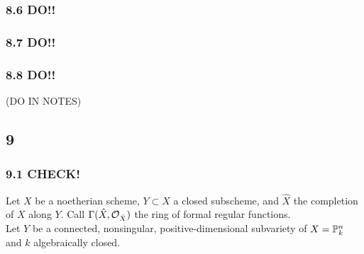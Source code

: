 \documentclass[12pt]{article}
\begin{document}
\subsubsection{8.6 DO!!}

\subsubsection{8.7 DO!!}

\subsubsection{8.8 DO!!}

(DO IN NOTES)

\subsection{9}

\subsubsection{9.1 CHECK!}

Let $X$ be a noetherian scheme, $Y \subset X$ a closed subscheme, and $\hat{X}$ the completion of $X$ along $Y$. Call $\Gamma(\hat{X}, \struct{\hat{X}})$ the ring of formal regular functions.
\bigskip\\
Let $Y$ be a connected, nonsingular, positive-dimensional subvariety of $X = \P^n_k$ and $k$ algebraically closed.
\end{document}
